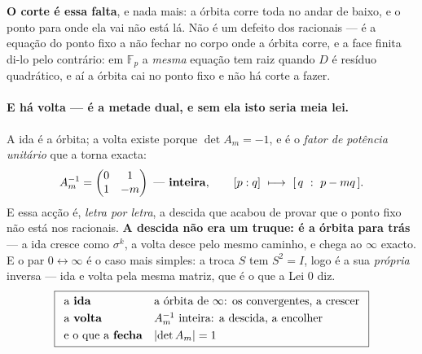 \documentclass[livro.tex]{subfiles}
\begin{document}
\noindent \textbf{O corte é essa falta}, e nada mais: a órbita corre toda no andar de
baixo, e o ponto para onde ela vai não está lá. Não é um defeito dos racionais --- é a
equação do ponto fixo a não fechar no corpo onde a órbita corre, e a face finita di-lo
pelo contrário: em $\mathbb{F}_p$ a \emph{mesma} equação tem raiz quando $D$ é resíduo
quadrático, e aí a órbita cai no ponto fixo e não há corte a fazer.

\paragraph{E há volta --- é a metade dual, e sem ela isto seria meia lei.} A ida é a
órbita; a volta existe porque $\det A_m=-1$, e é o \emph{fator de potência unitário} que a
torna exacta:
\[
A_m^{-1}=\begin{pmatrix}0&1\\1&-m\end{pmatrix}\ \text{---\ \textbf{inteira}},
\qquad
[p:q]\ \longmapsto\ [\,q\ :\ p-mq\,].
\]
E essa acção é, \emph{letra por letra}, a descida que acabou de provar que o ponto fixo não
está nos racionais. \textbf{A descida não era um truque: é a órbita para trás} --- a ida
cresce como $\sigma^{k}$, a volta desce pelo mesmo caminho, e chega ao $\infty$ exacto. E o
par $0\leftrightarrow\infty$ é o caso mais simples: a troca $S$ tem $S^{2}=I$, logo é a sua
\emph{própria} inversa --- ida e volta pela mesma matriz, que é o que a Lei $0$ diz.
\[
\boxed{
\begin{array}{ll}
\text{a \textbf{ida}} & \text{a órbita de }\infty\text{: os convergentes, a crescer}\\[3pt]
\text{a \textbf{volta}} & A_m^{-1}\text{ inteira: a descida, a encolher}\\[3pt]
\text{e o que a \textbf{fecha}} & \lvert\det A_m\rvert=1
\end{array}}
\]

\end{document}
